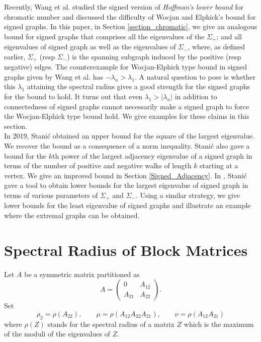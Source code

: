 \documentclass[12pt]{article}
\theoremstyle{plain}
\numberwithin{equation}{section}
\begin{document}
	Recently, Wang et al. \cite{wang2021eigenvalues} studied the signed version of \emph{Hoffman's lower bound} for chromatic number and discussed the difficulty of Wocjan and Elphick's bound for signed graphs. In this paper, in Section \ref{section_chromatic}, we give an analogous bound for signed graphs that comprises all the eigenvalues of the $\Sigma_+$; and all eigenvalues of signed graph as well as the eigenvalues of $\Sigma_{-}$, where, as defined earlier, $\Sigma_{+}$ (resp $\Sigma_{-}$)  is the spanning subgraph induced by the positive (resp negative) edges. The counterexample for Wocjan-Elphick type bound in signed graphs given by Wang et al. has $-\lambda_n > \lambda_1$. A natural question to pose is whether this $\lambda_1$ attaining the spectral radius gives a good strength for the signed graphs for the bound to hold. It turns out that even $\lambda_1 > \vert \lambda_n \vert$ in addition to connectedness of signed graphs cannot necessarily make a signed graph to force the Wocjan-Elphick type bound hold. We give examples for these claims in this section.\\
	\newline
	In 2019, Stani\'{c} \cite{Stanic2019bounding} obtained an upper bound for the square of the largest eigenvalue. We recover the bound as a consequence of a norm inequality. Stani\'{c} also gave a bound for the $k$th power of the largest adjacency eigenvalue of a signed graph in  terms of the number of positive and negative walks of length $k$ starting at a vertex. We give an improved bound in Section \ref{Signed_Adjacency}. In \cite{Stanic2018perturbations}, Stani\'{c} gave a tool to obtain
	lower bounds for the largest eigenvalue of signed graph in terms of various parameters
	of $\Sigma_+$ and $\Sigma_-$. Using a  similar strategy, we give lower bounds for the least eigenvalue of
	signed graphs and illustrate an example where the extremal graphs can be obtained.
	
	
	\section{Spectral Radius of Block Matrices}
	
	Let $A$ be a symmetric matrix partitioned as
	\[
	A=
	\begin{pmatrix}
		0 & A_{12}\\
		A_{21} & A_{22}
	\end{pmatrix}.
	\]
	Set
	\[
	\rho_2=\rho(A_{22}),\qquad
	\mu=\rho(A_{12}A_{22}A_{21}),\qquad
	\nu=\rho(A_{12}A_{21})
	\]
	where $\rho(Z)$ stands for the spectral radius of a matrix $Z$ which is the maximum of the moduli of the eigenvalues of $Z$.
	
\end{document}
